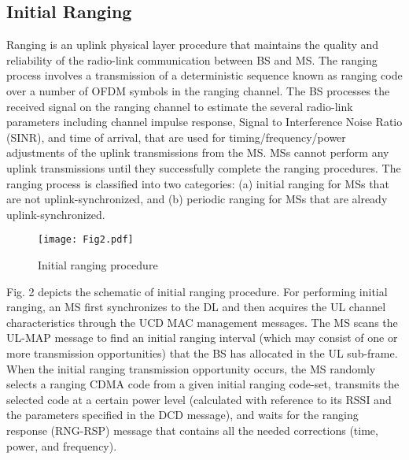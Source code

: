 \documentclass[preprint,12pt]{elsarticle}
\begin{document}
\subsection{Initial Ranging}
Ranging is an uplink physical layer procedure that maintains the quality and reliability of the radio-link communication between BS and MS. The ranging process involves a transmission of a deterministic sequence known as ranging code over a number of OFDM symbols in the ranging channel. The BS processes the received signal on the ranging channel to estimate the several radio-link parameters including channel impulse response, Signal to Interference Noise Ratio (SINR), and time of arrival, that are used for timing/frequency/power adjustments of the uplink transmissions from the MS. MSs cannot perform any uplink transmissions until they successfully complete the ranging procedures. The ranging process is classified into two categories: (a) initial ranging for MSs that are not uplink-synchronized, and (b) periodic ranging for MSs that are already uplink-synchronized.

\begin{figure}[h]
\centering
\texttt{[image: Fig2.pdf]}
\centering
\caption{Initial ranging procedure}
\end{figure}

Fig. 2 depicts the schematic of initial ranging procedure. For performing initial ranging, an MS first synchronizes to the DL and then acquires the UL channel characteristics through the UCD MAC management messages. The MS scans the UL-MAP message to find an initial ranging interval (which may consist of one or more transmission opportunities) that the BS has allocated in the UL sub-frame. When the initial ranging transmission opportunity occurs, the MS randomly selects a ranging CDMA code from a given initial ranging code-set, transmits the selected code at a certain power level (calculated with reference to its RSSI and the parameters specified in the DCD message), and waits for the ranging response (RNG-RSP) message that contains all the needed corrections (time, power, and frequency).
\end{document}
